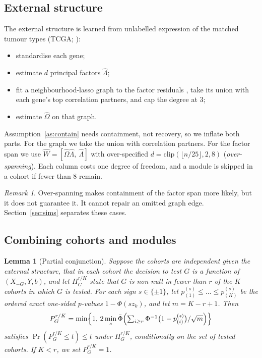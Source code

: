 \documentclass[10pt,twocolumn,letterpaper]{article}
\newtheorem{lemma}{Lemma}
\theoremstyle{remark}
\newtheorem{remark}{Remark}
\begin{document}
\subsection{External structure}

The external structure is learned from unlabelled expression of the matched tumour types (TCGA; \citealp{tcga2013pancan}):
\begin{itemize}
  \item standardise each gene;
  \item estimate $d$ principal factors $\hat\Lambda$;
  \item fit a neighbourhood-lasso graph to the factor residuals \citep{meinshausen2006}, take its union with each gene's top correlation partners, and cap the degree at 3;
  \item estimate $\hat\Omega$ on that graph.
\end{itemize}
Assumption~\ref{as:contain} needs containment, not recovery, so we inflate both parts. For the graph we take the union with correlation partners. For the factor span we use $\hat W=[\hat\Omega\hat\Lambda,\ \hat\Lambda]$ with over-specified $d=\mathrm{clip}(\lfloor n/25\rfloor,2,8)$ (\emph{over-spanning}). Each column costs one degree of freedom, and a module is skipped in a cohort if fewer than 8 remain.

\begin{remark}
Over-spanning makes containment of the factor span more likely, but it does not guarantee it. It cannot repair an omitted graph edge. Section~\ref{sec:sims} separates these cases.
\end{remark}

\subsection{Combining cohorts and modules}

\begin{lemma}[Partial conjunction]\label{lem:pc}
Suppose the cohorts are independent given the external structure, that in each cohort the decision to test $G$ is a function of $(X_{-G},Y,b)$, and let $H^{r/K}_G$ state that $G$ is non-null in fewer than $r$ of the $K$ cohorts in which $G$ is tested. For each sign $s\in\{\pm1\}$, let $p^{(s)}_{(1)}\le\dots\le p^{(s)}_{(K)}$ be the ordered exact one-sided $p$-values $1-\Phi(sz_k)$, and let $m=K-r+1$. Then
\[
P^{r/K}_G=\min\Bigl\{1,\,2\min_s\bar\Phi\Bigl(\textstyle\sum_{i\ge r}\Phi^{-1}\bigl(1-p^{(s)}_{(i)}\bigr)/\sqrt m\Bigr)\Bigr\}
\]
satisfies $\Pr(P^{r/K}_G\le t)\le t$ under $H^{r/K}_G$, conditionally on the set of tested cohorts. If $K<r$, we set $P^{r/K}_G=1$.
\end{lemma}
\end{document}
